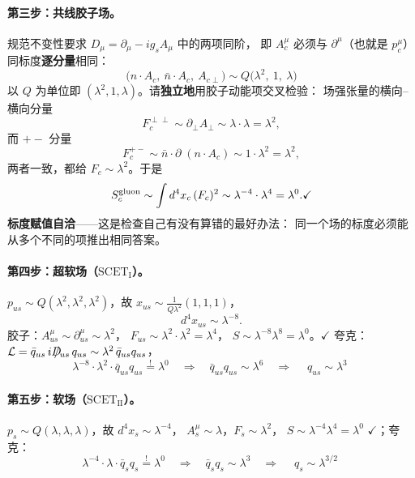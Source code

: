 \documentclass[UTF8,a4paper,11pt]{ctexart}
\theoremstyle{definition}
\theoremstyle{remark}
\theoremstyle{plain}
\newcommand{\Dsl}{D\mkern-11.5mu/}
\newcommand{\SCETI}{\text{SCET}_{\mathrm{I}}}
\newcommand{\SCETII}{\text{SCET}_{\mathrm{II}}}
\begin{document}
\paragraph{第三步：共线胶子场。}
规范不变性要求 $D_\mu=\partial_\mu-ig_sA_\mu$ 中的两项同阶，
即 $A_c^\mu$ 必须与 $\partial^\mu$（也就是 $p_c^\mu$）同标度\textbf{逐分量}相同：
\begin{equation}
  \boxed{\;
  \big(n\cdot A_c,\ \bar n\cdot A_c,\ A_{c\perp}\big)
  \sim Q\big(\lambda^2,\ 1,\ \lambda\big)\;}
  \label{eq:Acscaling}
\end{equation}
以 $Q$ 为单位即 $(\lambda^2,1,\lambda)$。请\textbf{独立地}用胶子动能项交叉检验：
场强张量的横向--横向分量
\begin{equation}
  F_c^{\perp\perp}\sim\partial_\perp A_\perp\sim\lambda\cdot\lambda=\lambda^2,
\end{equation}
而 $+-$ 分量
\begin{equation}
  F_c^{+-}\sim \bar n\cdot\partial\;(n\cdot A_c)\sim 1\cdot\lambda^2=\lambda^2 ,
\end{equation}
两者一致，都给 $F_c\sim\lambda^2$。于是
\begin{equation}
  S_c^{\rm gluon}\sim\int d^4x_c\,(F_c)^2\sim\lambda^{-4}\cdot\lambda^4=\lambda^0 .
  \checkmark
\end{equation}
\textbf{标度赋值自洽}——这是检查自己有没有算错的最好办法：
同一个场的标度必须能从多个不同的项推出相同答案。

\paragraph{第四步：超软场（$\SCETI$）。}
$p_{us}\sim Q(\lambda^2,\lambda^2,\lambda^2)$，故
$x_{us}\sim\frac{1}{Q\lambda^2}(1,1,1)$，
\begin{equation}
  d^4x_{us}\sim\lambda^{-8} .
\end{equation}
胶子：$A_{us}^\mu\sim\partial_{us}^\mu\sim\lambda^2$，
$F_{us}\sim\lambda^2\cdot\lambda^2=\lambda^4$，
$S\sim\lambda^{-8}\lambda^8=\lambda^0$。$\checkmark$
夸克：$\mathcal L=\bar q_{us}\,i\Dsl_{us}\,q_{us}\sim\lambda^2\,\bar q_{us}q_{us}$，
\begin{equation}
  \lambda^{-8}\cdot\lambda^2\cdot\bar q_{us}q_{us}\stackrel{!}{=}\lambda^0
  \quad\Longrightarrow\quad
  \bar q_{us}q_{us}\sim\lambda^6
  \quad\Longrightarrow\quad
  \boxed{\;q_{us}\sim\lambda^3\;}
\end{equation}

\paragraph{第五步：软场（$\SCETII$）。}
$p_{s}\sim Q(\lambda,\lambda,\lambda)$，故 $d^4x_s\sim\lambda^{-4}$，
$A_s^\mu\sim\lambda$，$F_s\sim\lambda^2$，
$S\sim\lambda^{-4}\lambda^4=\lambda^0$ $\checkmark$；夸克：
\begin{equation}
  \lambda^{-4}\cdot\lambda\cdot\bar q_sq_s\stackrel{!}{=}\lambda^0
  \quad\Longrightarrow\quad
  \bar q_sq_s\sim\lambda^3
  \quad\Longrightarrow\quad
  \boxed{\;q_{s}\sim\lambda^{3/2}\;}
\end{equation}
\end{document}
